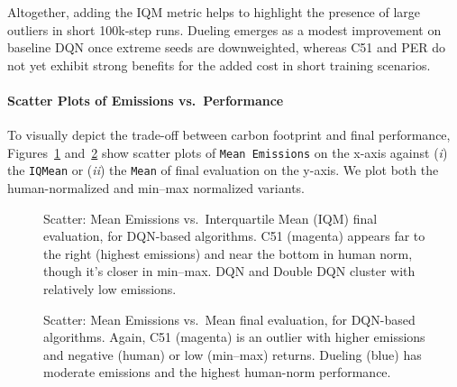 Altogether, adding the IQM metric helps to highlight the presence of large outliers
in short 100k‐step runs. Dueling emerges as a modest improvement on baseline DQN
once extreme seeds are downweighted, whereas C51 and PER do not yet exhibit 
strong benefits for the added cost in short training scenarios.


\paragraph{Scatter Plots of Emissions vs.\ Performance}
To visually depict the trade-off between carbon footprint and final performance,
Figures~\ref{fig:dqn_scatter_mean_iqm} and~\ref{fig:dqn_scatter_mean_mean} 
show scatter plots of \texttt{Mean~Emissions} on the x-axis against 
(\emph{i}) the \texttt{IQMean} or 
(\emph{ii}) the \texttt{Mean} of final evaluation on the y-axis. 
We plot both the human-normalized and min--max normalized variants.

\begin{figure}
	\centering
	\quad
	\caption{Scatter: Mean Emissions vs.\ Interquartile Mean (IQM) final evaluation, for DQN-based algorithms. 
		C51 (magenta) appears far to the right (highest emissions) 
		and near the bottom in human norm, though it's closer in min--max. 
		DQN and Double DQN cluster with relatively low emissions.}
	\label{fig:dqn_scatter_mean_iqm}
\end{figure}

\begin{figure}
	\centering
	\quad
	\caption{Scatter: Mean Emissions vs.\ Mean final evaluation, for DQN-based algorithms. 
		Again, C51 (magenta) is an outlier with higher emissions and negative (human) or low (min--max) returns. 
		Dueling (blue) has moderate emissions and the highest human-norm performance.}
	\label{fig:dqn_scatter_mean_mean}
\end{figure}

